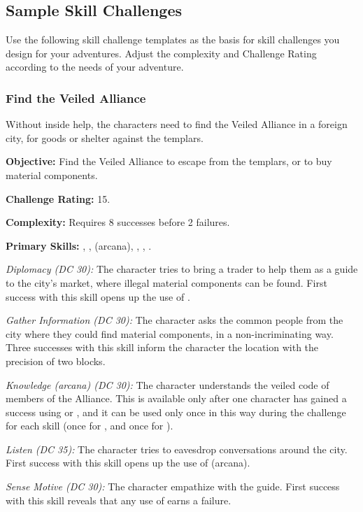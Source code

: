 \subsection{Sample Skill Challenges}
Use the following skill challenge templates as the basis for skill challenges you design for your adventures. Adjust the complexity and Challenge Rating according to the needs of your adventure.

\subsubsection{Find the Veiled Alliance}
Without inside help, the characters need to find the Veiled Alliance in a foreign city, for goods or shelter against the templars.

\textbf{Objective:} Find the Veiled Alliance to escape from the templars, or to buy material components.

\textbf{Challenge Rating:} 15.

\textbf{Complexity:} Requires 8 successes before 2 failures.

\textbf{Primary Skills:} , ,  (arcana), , , .

\textit{Diplomacy (DC 30):} The character tries to bring a trader to help them as a guide to the city's market, where illegal material components can be found. First success with this skill opens up the use of .

\textit{Gather Information (DC 30):} The character asks the common people from the city where they could find material components, in a non-incriminating way. Three successes with this skill inform the character the location with the precision of two blocks.

\textit{Knowledge (arcana) (DC 30):} The character understands the veiled code of members of the Alliance. This is available only after one character has gained a success using  or , and it can be used only once in this way during the challenge for each skill (once for , and once for ).

\textit{Listen (DC 35):} The character tries to eavesdrop conversations around the city. First success with this skill opens up the use of  (arcana).

\textit{Sense Motive (DC 30):} The character empathize with the guide. First success with this skill reveals that any use of  earns a failure.


